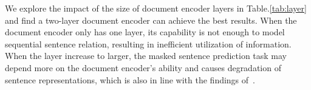 We explore the impact of the size of document encoder layers in Table.\ref{tab:layer} and find a two-layer document encoder can achieve the best results. When the document encoder only has one layer, its capability is not enough to model sequential sentence relation, resulting in inefficient utilization of information. When the layer increase to larger, the masked sentence prediction task may depend more on the document encoder's ability and causes degradation of sentence representations, which is also in line with the findings of~\citep{wu2022contextual, lu-etal-2021-less}.


